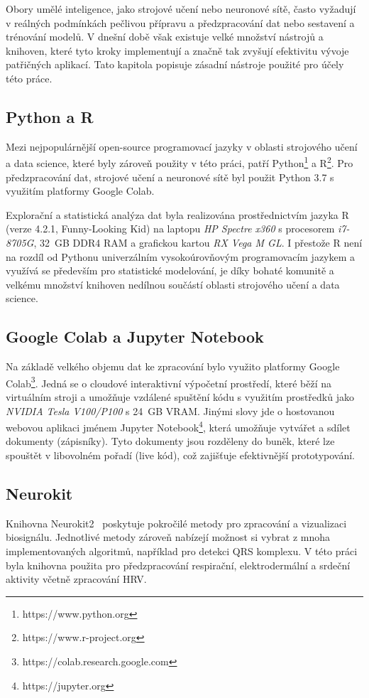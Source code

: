 Obory umělé inteligence, jako strojové učení nebo neuronové sítě, často vyžadují
v reálných podmínkách pečlivou přípravu a předzpracování dat nebo sestavení a
trénování modelů. V dnešní době však existuje velké množství nástrojů a
knihoven, které tyto kroky implementují a značně tak zvyšují efektivitu vývoje
patřičných aplikací. Tato kapitola popisuje zásadní nástroje použité pro účely
této práce.

\subsection{Python a R}
\label{subsec:python_r}
Mezi nejpopulárnější open-source programovací jazyky v oblasti strojového učení
a data science, které byly zároveň použity v této práci, patří
Python\footnote{https://www.python.org} a R\footnote{https://www.r-project.org}.
Pro předzpracování dat, strojové učení a neuronové sítě byl použit
Python 3.7 s využitím platformy Google Colab.

Explorační a statistická analýza dat byla realizována prostřednictvím jazyka R
(verze 4.2.1, Funny-Looking Kid) na laptopu \textit{HP Spectre x360} s
procesorem \textit{i7-8705G}, 32~GB DDR4 RAM a grafickou kartou \textit{RX Vega
M GL}. I přestože R není na rozdíl od Pythonu univerzálním vysokoúrovňovým
programovacím jazykem a využívá se především pro statistické modelování, je díky
bohaté komunitě a velkému množství knihoven nedílnou součástí oblasti strojového
učení a data science. 

\subsection{Google Colab a Jupyter Notebook}
\label{subsec:jupyter_colab}
Na základě velkého objemu dat ke zpracování bylo využito platformy Google
Colab\footnote{https://colab.research.google.com}. Jedná se o cloudové
interaktivní výpočetní prostředí, které běží na virtuálním stroji a umožňuje
vzdálené spuštění kódu s využitím prostředků jako \textit{NVIDIA Tesla
V100/P100} s 24~GB VRAM. Jinými slovy jde o hostovanou webovou aplikaci jménem
Jupyter Notebook\footnote{https://jupyter.org}, která umožňuje vytvářet a sdílet
dokumenty (zápisníky). Tyto dokumenty jsou rozděleny do buněk, které lze
spouštět v libovolném pořadí (live kód), což zajišťuje efektivnější
prototypování.

\subsection{Neurokit}
\label{subsec:neurokit}
Knihovna Neurokit2~\cite{Makowski2021neurokit} poskytuje pokročilé metody pro
zpracování a vizualizaci biosignálu. Jednotlivé metody zároveň nabízejí možnost
si vybrat z mnoha implementovaných algoritmů, například pro detekci QRS
komplexu. V této práci byla knihovna použita pro předzpracování respirační,
elektrodermální a srdeční aktivity včetně zpracování HRV.

